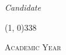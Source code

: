 \begin{titlepage}
\begin{center}
\begin{large}
\vspace{5pt}

\begin{flushright}
\textit{Candidate}\\
\vspace{5pt}
\myName{}
\end{flushright}
\end{large}

\vspace{25pt}

\line(1, 0){338} \\
\begin{normalsize}
\textsc{Academic Year \myAA}
\end{normalsize}

\end{center}
\end{titlepage}
